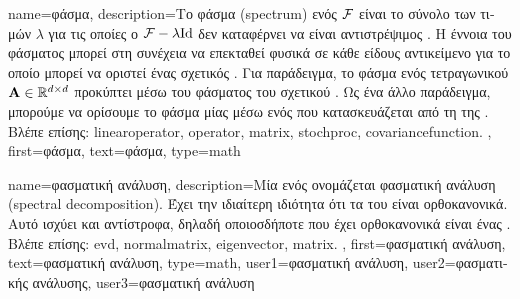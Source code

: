 {name={\foreignlanguage{greek}{φάσμα}},
	description={\foreignlanguage{greek}{Το φάσμα} (spectrum) \foreignlanguage{greek}{ενός} 
		 $\mathcal{F}$ \foreignlanguage{greek}{είναι το σύνολο των τιμών $\lambda$ για τις οποίες ο}  
		 $\mathcal{F} - \lambda \mathrm{Id}$ \foreignlanguage{greek}{δεν καταφέρνει να είναι αντιστρέψιμος} \cite{Muller2003}. 
  		\foreignlanguage{greek}{Η έννοια του φάσματος μπορεί στη συνέχεια να επεκταθεί φυσικά σε κάθε είδους αντικείμενο για το 
		οποίο μπορεί να οριστεί ένας σχετικός} . \foreignlanguage{greek}{Για παράδειγμα, 
		το φάσμα ενός τετραγωνικού}  ${\bf A} \in \mathbb{R}^{d \times d}$ 
  		\foreignlanguage{greek}{προκύπτει μέσω του φάσματος του σχετικού}  \cite{Horn91}.
  		\foreignlanguage{greek}{Ως ένα άλλο παράδειγμα, μπορούμε να ορίσουμε το φάσμα μίας}  
		\foreignlanguage{greek}{μέσω ενός}  \foreignlanguage{greek}{που κατασκευάζεται από τη}
		 \foreignlanguage{greek}{της} \cite{Rasmussen2006Gaussian}.
		\\
		\foreignlanguage{greek}{Βλέπε επίσης:} \gls{linearoperator}, \gls{operator}, \gls{matrix}, \gls{stochproc}, \gls{covariancefunction}. },
	first={\foreignlanguage{greek}{φάσμα}},
	text={\foreignlanguage{greek}{φάσμα}},
	type=math
}

{name={\foreignlanguage{greek}{φασματική ανάλυση}},
	description={\foreignlanguage{greek}{Μία}  \foreignlanguage{greek}{ενός} 
		\foreignlanguage{greek}{ονομάζεται φασματική ανάλυση} (spectral 
		decomposition). \foreignlanguage{greek}{Έχει την ιδιαίτερη ιδιότητα ότι τα} 
		 \foreignlanguage{greek}{του}  \foreignlanguage{greek}{είναι 
		ορθοκανονικά. Αυτό ισχύει και αντίστροφα, δηλαδή οποιοσδήποτε}  \foreignlanguage{greek}{που έχει 
		ορθοκανονικά}  \foreignlanguage{greek}{είναι ένας} .
		\\
		\foreignlanguage{greek}{Βλέπε επίσης:} \gls{evd}, \gls{normalmatrix}, \gls{eigenvector}, \gls{matrix}. },
	first={\foreignlanguage{greek}{φασματική ανάλυση}},
	text={\foreignlanguage{greek}{φασματική ανάλυση}},
	type=math,
	user1={\foreignlanguage{greek}{φασματική ανάλυση}}, %
    	user2={\foreignlanguage{greek}{φασματικής ανάλυσης}}, %
	user3={\foreignlanguage{greek}{φασματική ανάλυση}} %
}


